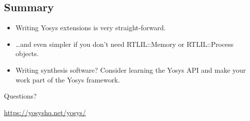 
\subsection{Summary}

\begin{frame}{\subsecname}
\begin{itemize}
\item Writing Yosys extensions is very straight-forward.
\item \dots and even simpler if you don't need RTLIL::Memory or RTLIL::Process objects.

\bigskip
\item Writing synthesis software? Consider learning the Yosys API and make your work
part of the Yosys framework.
\end{itemize}

\bigskip
\bigskip
\begin{center}
Questions?
\end{center}

\bigskip
\bigskip
\begin{center}
\url{https://yosyshq.net/yosys/}
\end{center}
\end{frame}

